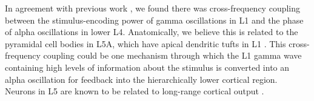 In agreement with previous work \citep{Spaak2012}, we found there was cross-frequency coupling between the stimulus-encoding power of gamma oscillations in \ac{L1} and the phase of alpha oscillations in lower \ac{L4}.
Anatomically, we believe this is related to the pyramidal cell bodies in \ac{L5A}, which have apical dendritic tufts in \ac{L1} \citep{Hill2013,Zhu2004}.
This cross-frequency coupling could be one mechanism through which the \ac{L1} gamma wave containing high levels of information about the stimulus is converted into an alpha oscillation for feedback into the hierarchically lower cortical region.
Neurons in \ac{L5} are known to be related to long-range cortical output \citep{Hill2013}.
